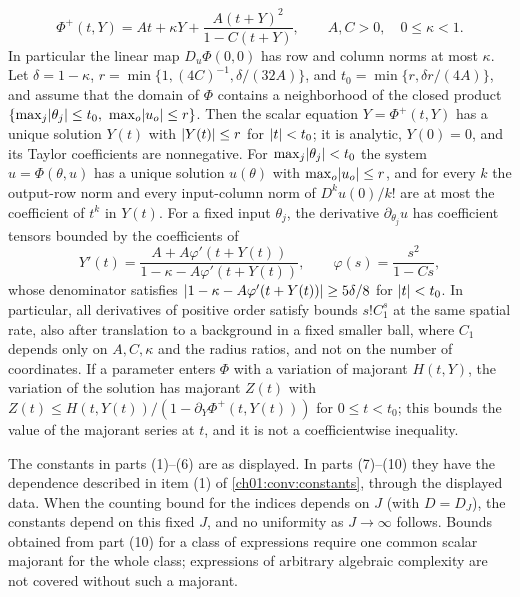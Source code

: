 \begin{lemma}
\begin{enumerate}
\[
 \Phi^+(t,Y)=At+\kappa Y+\frac{A(t+Y)^2}{1-C(t+Y)},\qquad A,C>0,\quad0\le\kappa<1.
\]
In particular the linear map $D_u\Phi(0,0)$ has row and column norms at most $\kappa$. Let $\delta=1-\kappa$, $r=\min\{1,(4C)^{-1},\delta/(32A)\}$, and $t_0=\min\{r,\delta r/(4A)\}$, and assume that the domain of $\Phi$ contains a neighborhood of the closed product $\{\max_j\lvert \theta_j\rvert\le t_0,\ \max_o\lvert u_o\rvert\le r\}$. Then the scalar equation $Y=\Phi^+(t,Y)$ has a unique solution $Y(t)$ with $\lvert Y(t)\rvert\le r$ for $\lvert t\rvert<t_0$; it is analytic, $Y(0)=0$, and its Taylor coefficients are nonnegative. For $\max_j\lvert \theta_j\rvert<t_0$ the system $u=\Phi(\theta,u)$ has a unique solution $u(\theta)$ with $\max_o\lvert u_o\rvert\le r$, and for every $k$ the output-row norm and every input-column norm of $D^ku(0)/k!$ are at most the coefficient of $t^k$ in $Y(t)$. For a fixed input $\theta_j$, the derivative $\partial_{\theta_j}u$ has coefficient tensors bounded by the coefficients of
\[
 Y'(t)=\frac{A+A\varphi'(t+Y(t))}{1-\kappa-A\varphi'(t+Y(t))},\qquad\varphi(s)=\frac{s^2}{1-Cs},
\]
whose denominator satisfies $\lvert 1-\kappa-A\varphi'(t+Y(t))\rvert\ge5\delta/8$ for $\lvert t\rvert<t_0$. In particular, all derivatives of positive order satisfy bounds $s!C_1^s$ at the same spatial rate, also after translation to a background in a fixed smaller ball, where $C_1$ depends only on $A,C,\kappa$ and the radius ratios, and not on the number of coordinates. If a parameter enters $\Phi$ with a variation of majorant $H(t,Y)$, the variation of the solution has majorant $Z(t)$ with $Z(t)\le H(t,Y(t))/(1-\partial_Y\Phi^+(t,Y(t)))$ for $0\le t<t_0$; this bounds the value of the majorant series at $t$, and it is not a coefficientwise inequality.
\end{enumerate}
The constants in parts (1)--(6) are as displayed. In parts (7)--(10) they have the dependence described in item (1) of \cref{ch01:conv:constants}, through the displayed data. When the counting bound for the indices depends on $J$ (with $D=D_J$), the constants depend on this fixed $J$, and no uniformity as $J\to\infty$ follows. Bounds obtained from part (10) for a class of expressions require one common scalar majorant for the whole class; expressions of arbitrary algebraic complexity are not covered without such a majorant.
\end{lemma}

